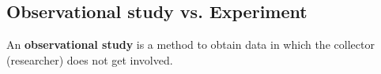 \documentclass{article}
\newcounter{example}[section]
\newenvironment{example}[1][]{\refstepcounter{example}\par\medskip
   {\color{red}\textbf{Example~\theexample. #1}}}{\medskip}
\begin{document}







\subsection*{Observational study vs. Experiment}

\begin{tcolorbox}[colframe=green!60!black,title=\textbf{Observational Study}]
An \textbf{observational study} is a method to obtain data in which the collector (researcher) does not get involved.
\end{tcolorbox}
\vspace{8pt} 
\end{document}
